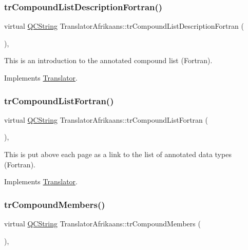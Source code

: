 \subsubsection{\texorpdfstring{trCompoundListDescriptionFortran()}{trCompoundListDescriptionFortran()}}
{\footnotesize\ttfamily virtual \mbox{\hyperlink{class_q_c_string}{Q\+C\+String}} Translator\+Afrikaans\+::tr\+Compound\+List\+Description\+Fortran (\begin{DoxyParamCaption}{ }\end{DoxyParamCaption})\hspace{0.3cm}{\ttfamily [inline]}, {\ttfamily [virtual]}}

This is an introduction to the annotated compound list (Fortran). 

Implements \mbox{\hyperlink{class_translator}{Translator}}.

\mbox{\label{class_translator_afrikaans_ab0efe2cdaf976e6f2fbb66a62d768576}} 
\subsubsection{\texorpdfstring{trCompoundListFortran()}{trCompoundListFortran()}}
{\footnotesize\ttfamily virtual \mbox{\hyperlink{class_q_c_string}{Q\+C\+String}} Translator\+Afrikaans\+::tr\+Compound\+List\+Fortran (\begin{DoxyParamCaption}{ }\end{DoxyParamCaption})\hspace{0.3cm}{\ttfamily [inline]}, {\ttfamily [virtual]}}

This is put above each page as a link to the list of annotated data types (Fortran). 

Implements \mbox{\hyperlink{class_translator}{Translator}}.

\mbox{\label{class_translator_afrikaans_a17009805453c4e9c4cfbb193a19e24b5}} 
\subsubsection{\texorpdfstring{trCompoundMembers()}{trCompoundMembers()}}
{\footnotesize\ttfamily virtual \mbox{\hyperlink{class_q_c_string}{Q\+C\+String}} Translator\+Afrikaans\+::tr\+Compound\+Members (\begin{DoxyParamCaption}{ }\end{DoxyParamCaption})\hspace{0.3cm}{\ttfamily [inline]}, {\ttfamily [virtual]}}

